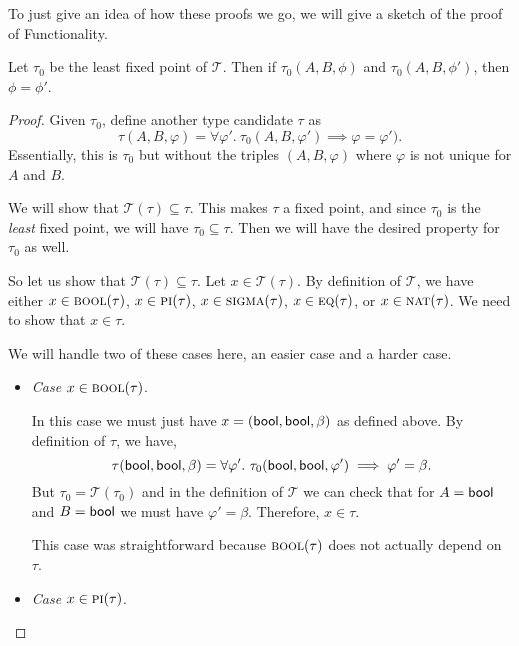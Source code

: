 \documentclass{article} \usepackage{chtt-notes} \usepackage{stmaryrd}
\newcommand{\T}{\mathcal{T}}
\begin{document}
To just give an idea of how these proofs we go, we will give a sketch of the proof
of Functionality.

\begin{theorem*}[Functionality]
Let $\tau_0$ be the least fixed point of $\T$. Then if
$\tau_0(A, B, \phi)$ and $\tau_0(A, B, \phi')$, then $\phi = \phi'$.
\end{theorem*}
\begin{proof}
  Given $\tau_0$, define another type candidate $\tau$ as
  \[ \tau(A,B,\varphi) = \forall \varphi' .~ \tau_0(A,B,\varphi') \implies \varphi = \varphi'). \]
  Essentially, this is $\tau_0$ but without the triples $(A,B,\varphi)$ where $\varphi$ is not
  unique for $A$ and $B$.

  We will show that $\T(\tau) \subseteq \tau$. This makes $\tau$ a fixed point, and since
  $\tau_0$ is the \emph{least} fixed point, we will have $\tau_0 \subseteq \tau$. Then we
  will have the desired property for $\tau_0$ as well.

  So let us show that $\T(\tau) \subseteq \tau$. Let $x \in \T(\tau)$. By definition of
  $\T$, we have either
  $x \in \textsc{bool}(\tau)$,
  $x \in \textsc{pi}(\tau)$,
  $x \in \textsc{sigma}(\tau)$,
  $x \in \textsc{eq}(\tau)$, or
  $x \in \textsc{nat}(\tau)$. We need to show that $x \in \tau$.

  We will handle two of these cases here, an easier case and a harder case.
  \begin{itemize}
    \item \emph{Case} $x \in \textsc{bool}(\tau)$.

    In this case we must just have $x = (\mathsf{bool}, \mathsf{bool}, \beta)$ as defined above.
    By definition of $\tau$, we have,
    \[ \tau(\mathsf{bool}, \mathsf{bool}, \beta) = \forall \varphi' .~ \tau_0(\mathsf{bool},\mathsf{bool},\varphi') \implies \varphi' = \beta. \]
    But $\tau_0 = \T(\tau_0)$ and in the definition of $\T$ we can check that
    for $A=\mathsf{bool}$ and $B=\mathsf{bool}$ we must have $\varphi' = \beta$. Therefore,
    $x \in \tau$.

    This case was straightforward because $\textsc{bool}(\tau)$ does not actually depend
    on $\tau$.

    \item \emph{Case} $x \in \textsc{pi}(\tau)$.


\end{itemize}
\end{proof}
\end{document}
